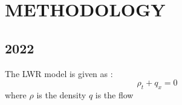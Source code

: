 \chapter{METHODOLOGY}

\section{2022}
The LWR  model is given as \citep{Appati2015}: 
\begin{equation}
	\rho_{t} + q_{x} = 0
\end{equation}
where $\rho$ is the density $q$ is the flow